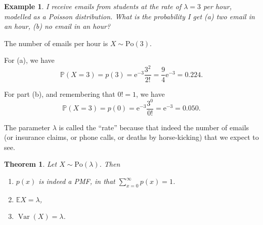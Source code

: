 \documentclass[
  a4paper,
]{book}
\providecommand{\tightlist}{%
  \setlength{\itemsep}{0pt}\setlength{\parskip}{0pt}}
\newtheorem{theorem}{Theorem}[chapter]
\theoremstyle{definition}
\theoremstyle{definition}
\newtheorem{example}{Example}[chapter]
\theoremstyle{definition}
\theoremstyle{definition}
\theoremstyle{remark}
\begin{document}
\begin{example}
\emph{I receive emails from students at the rate of \(\lambda = 3\) per hour, modelled as a Poisson distribution. What is the probability I get (a) two email in an hour, (b) no email in an hour?}

The number of emails per hour is \(X \sim \mathrm{Po}(3)\).

For (a), we have
\[ \mathbb P(X = 3) = p(3) = \mathrm{e}^{-3} \frac{3^2}{2!} = \frac94 \mathrm{e}^{-3} = 0.224 . \]

For part (b), and remembering that \(0! = 1\), we have
\[ \mathbb P(X = 3) = p(0) = \mathrm{e}^{-3} \frac{3^0}{0!} = \mathrm{e}^{-3} = 0.050 . \]
\end{example}

The parameter \(\lambda\) is called the ``rate'' because that indeed the number of emails (or insurance claims, or phone calls, or deaths by horse-kicking) that we expect to see.

\begin{theorem}

Let \(X \sim \text{Po}(\lambda)\). Then

\begin{enumerate}
\def\labelenumi{\arabic{enumi}.}
\tightlist
\item
  \(p(x)\) is indeed a PMF, in that \(\displaystyle\sum_{x=0}^\infty p(x) = 1\).
\item
  \(\mathbb EX = \lambda\),
\item
  \(\operatorname{Var}(X) = \lambda\).
\end{enumerate}

\end{theorem}
\end{document}
